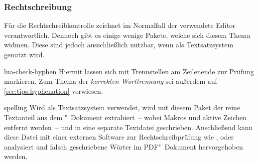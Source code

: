 %



\subsubsection{%
  Rechtschreibung%
}
Für die Rechtschreibkontrolle zeichnet im Normalfall der verwendete Editor 
verantwortlich. Dennoch gibt es einige wenige Pakete, welche sich diesem Thema 
widmen. Diese sind jedoch ausschließlich nutzbar, wenn als Textsatzsystem 
 genutzt wird.
\begin{packages}
\item[lua-check-hyphen]
  Hiermit lassen sich mit  Trennstellen am Zeilenende zur 
  Prüfung markieren. Zum Thema der \textit{korrekten Worttrennung} sei außerdem 
  auf \autoref{sec:tips:hyphenation} verwiesen.
\item[spelling]
  Wird  als Textsatzsystem verwendet, wird mit diesem Paket 
  der reine Textanteil aus dem "~Dokument extrahiert~-- wobei 
  Makros und aktive Zeichen entfernt werden~-- und in eine separate Textdatei 
  geschrieben. Anschließend kann diese Datei mit einer externen Software zur  
  Rechtschreibprüfung wie ,  oder 
   analysiert und falsch geschriebene Wörter im 
  PDF"~Dokument hervorgehoben werden.
\end{packages}
%



